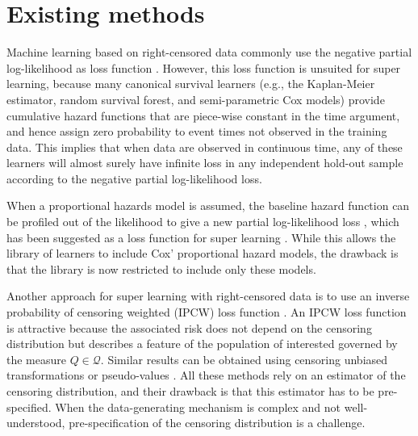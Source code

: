 \documentclass{statsoc}
\numberwithin{theorem}{section}
\newcommand{\1}{\mathds{1}}
\begin{document}
\section{Existing methods}
\label{sec:relat-liter-exist}

Machine learning based on right-censored data commonly use the negative partial
log-likelihood as loss function
\citep[e.g.,][]{li2016regularized,yao2017deep,lee2018deephit,katzman2018deepsurv,gensheimer2019scalable,lee2021boosted,kvamme2021continuous}.
However, this loss function is unsuited for super learning, because many
canonical survival learners (e.g., the Kaplan-Meier estimator, random survival
forest, and semi-parametric Cox models) provide cumulative hazard functions that
are piece-wise constant in the time argument, and hence assign zero probability
to event times not observed in the training data. This implies that when data
are observed in continuous time, any of these learners will almost surely have
infinite loss in any independent hold-out sample according to the negative
partial log-likelihood loss.

When a proportional hazards model is assumed, the baseline hazard function can
be profiled out of the likelihood to give a new partial log-likelihood loss
\citep{cox1972regression}, which has been suggested as a loss function for super
learning \citep{golmakani2020super,verweij1993cross}. While this allows the
library of learners to include Cox' proportional hazard models, the drawback is
that the library is now restricted to include only these models.

Another approach for super learning with right-censored data is to use an
inverse probability of censoring weighted (IPCW) loss function
\citep{graf1999assessment,van2003unicv,molinaro2004tree,keles2004asymptotically,hothorn2006survival,gerds2006consistent,gonzalez2021stacked}.
An IPCW loss function is attractive because the associated risk does not depend
on the censoring distribution but describes a feature of the population of
interested governed by the measure \( Q \in \mathcal{Q} \). Similar results can
be obtained using censoring unbiased transformations
\citep{fan1996local,steingrimsson2019censoring} or pseudo-values
\citep{andersen2003generalised,mogensen2013random,sachs2019ensemble}. All these
methods rely on an estimator of the censoring distribution, and their drawback
is that this estimator has to be pre-specified. When the data-generating
mechanism is complex and not well-understood, pre-specification of the censoring
distribution is a challenge.
\end{document}
